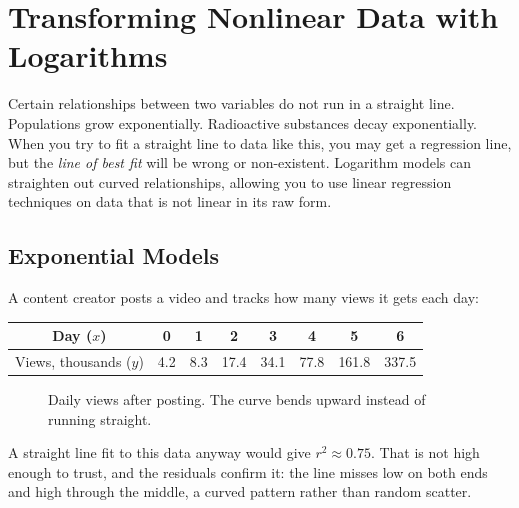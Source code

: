 \chapter{Transforming Nonlinear Data with Logarithms}


Certain relationships between two variables do not run in a straight line. Populations grow exponentially. Radioactive substances decay exponentially. When you try to fit a straight line to data like this, you may get a regression line, but the \textit{line of best fit} will be wrong or non-existent. Logarithm models can straighten out curved relationships, allowing you to use linear regression techniques on data that is not linear in its raw form.

\section{Exponential Models}

A content creator posts a video and tracks how many views it gets each day:

\begin{table}[H]
\centering
\begin{tabular}{c|ccccccc}
Day ($x$) & 0 & 1 & 2 & 3 & 4 & 5 & 6 \\
\hline
Views, thousands ($y$) & 4.2 & 8.3 & 17.4 & 34.1 & 77.8 & 161.8 & 337.5
\end{tabular}
\end{table}

\begin{figure}[H]
    \centering
    \caption{Daily views after posting. The curve bends upward instead of running straight.}
    \label{fig:viewsRaw}
\end{figure}

A straight line fit to this data anyway would give $r^2 \approx 0.75$. That is not high enough to trust, and the residuals confirm it: the line misses low on both ends and high through the middle, a curved pattern rather than random scatter.

